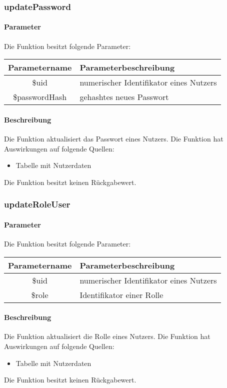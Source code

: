 \subsubsection{updatePassword}
\paragraph{Parameter} Die Funktion besitzt folgende Parameter:
\begin{table}[H]
	\begin{tabular}{|c|p{11cm}|}
		\hline
		\textbf{Parametername} & \textbf{Parameterbeschreibung} \\ \hline
		\$uid          & numerischer Identifikator eines Nutzers \\ \hline
		\$passwordHash & gehashtes neues Passwort \\ \hline
	\end{tabular}
\end{table}
\paragraph{Beschreibung} Die Funktion aktualisiert das Passwort eines Nutzers. Die Funktion hat Auswirkungen auf folgende Quellen:
\begin{itemize}
	\item Tabelle mit Nutzerdaten
\end{itemize}
Die Funktion besitzt keinen Rückgabewert.
\subsubsection{updateRoleUser}
\paragraph{Parameter} Die Funktion besitzt folgende Parameter:
\begin{table}[H]
	\begin{tabular}{|c|p{11cm}|}
		\hline
		\textbf{Parametername} & \textbf{Parameterbeschreibung} \\ \hline
		\$uid  & numerischer Identifikator eines Nutzers \\ \hline
		\$role & Identifikator einer Rolle \\ \hline
	\end{tabular}
\end{table}
\paragraph{Beschreibung} Die Funktion aktualisiert die Rolle eines Nutzers. Die Funktion hat Auswirkungen auf folgende Quellen:
\begin{itemize}
	\item Tabelle mit Nutzerdaten
\end{itemize}
Die Funktion besitzt keinen Rückgabewert.
